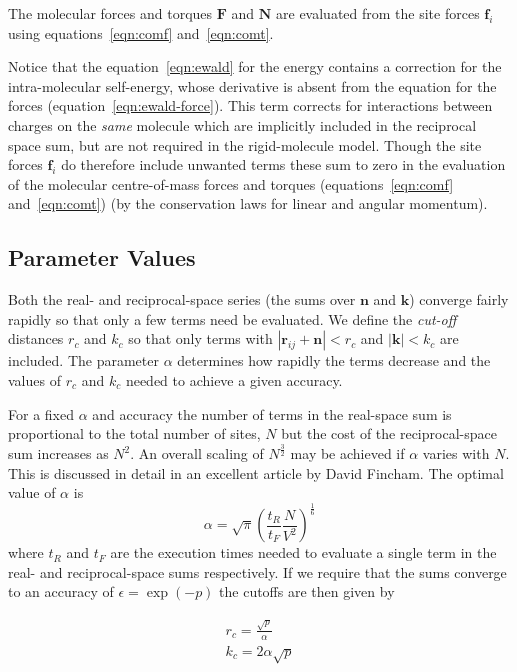 \documentclass[a4paper,twoside]{report}
\newcommand{\bm}[1]{\mathbf{#1}}
\begin{document}
The molecular forces and torques $\bm{F}$ and $\bm{N}$ are evaluated
from the site forces $\bm{f}_i$ using equations~\ref{eqn:comf} 
and~\ref{eqn:comt}.

Notice that the equation~\ref{eqn:ewald} for the energy contains a
correction for the intra-molecular self-energy, whose derivative is
absent from the equation for the forces
(equation~\ref{eqn:ewald-force}).  This term corrects for interactions
between charges on the \emph{same} molecule which are implicitly
included in the reciprocal space sum, but are not required in the
rigid-molecule model.  Though the site forces $\bm{f}_i$ do therefore
include unwanted terms these sum to zero in the evaluation of the
molecular centre-of-mass forces and torques (equations~\ref{eqn:comf}
and~\ref{eqn:comt}) (by the conservation laws for linear and angular
momentum).

\subsection{Parameter Values}
\label{sec:ewald-auto}

Both the real- and reciprocal-space series (the sums over $\bm{n}$ and
$\bm{k}$) converge fairly rapidly so that only a few terms need be
evaluated.  We define the \emph{cut-off} distances $r_c$ and $k_c$ so
that only terms with $| \bm{r}_{ij} +\bm{n} | < r_c$ and $|\bm{k}| < k_c$
are included.  The parameter $\alpha$ determines how rapidly the terms
decrease and the values of $r_c$ and $k_c$ needed to achieve a given
accuracy. 

For a fixed $\alpha$ and accuracy the number of terms in the
real-space sum is proportional to the total number of sites, $N$ but
the cost of the reciprocal-space sum increases as $N^2$. An overall
scaling of $N^\frac{3}{2}$ may be achieved if $\alpha$ varies with
$N$. This is discussed in detail in an excellent article by David
Fincham\cite{fincham:94}.  The optimal value of $\alpha$ is
%
\begin{equation}
\alpha = \sqrt{\pi} \left ( \frac{t_R}{t_F} \frac{N}{V^2}\right )
^\frac{1}{6} 
\label{eqn:ewald-alpha}
\end{equation}
%
where $t_R$ and $t_F$ are the execution times needed to evaluate a
single term in the real- and reciprocal-space sums respectively.
If we require that the sums converge to an accuracy of $ \epsilon =
\exp ( -p )$ the cutoffs are then given by

\begin{eqnarray}
r_c  = \frac{\sqrt{p}}{\alpha} \\
k_c = 2 \alpha \sqrt{p}
\label{eqn:ewald-cut}
\end{eqnarray}
\end{document}

